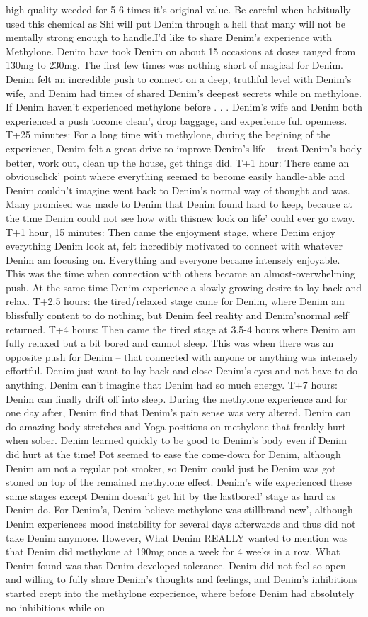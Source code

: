 \documentclass[12pt]{book}
\begin{document}
high quality weeded for 5-6 times it's original value. Be careful when habitually used this chemical as Shi will put Denim through a hell that many will not be mentally strong enough to handle.I'd like to share Denim's experience with Methylone. Denim have took Denim on about 15 occasions at doses ranged from 130mg to 230mg. The first few times was nothing short of magical for Denim. Denim felt an incredible push to connect on a deep, truthful level with Denim's wife, and Denim had times of shared Denim's deepest secrets while on methylone. If Denim haven't experienced methylone before . . .  Denim's wife and Denim both experienced a push tocome clean', drop baggage, and experience full openness. T+25 minutes: For a long time with methylone, during the begining of the experience, Denim felt a great drive to improve Denim's life -- treat Denim's body better, work out, clean up the house, get things did. T+1 hour: There came an obviousclick' point where everything seemed to become easily handle-able and Denim couldn't imagine went back to Denim's normal way of thought and was. Many promised was made to Denim that Denim found hard to keep, because at the time Denim could not see how with thisnew look on life' could ever go away. T+1 hour, 15 minutes: Then came the enjoyment stage, where Denim enjoy everything Denim look at, felt incredibly motivated to connect with whatever Denim am focusing on. Everything and everyone became intensely enjoyable. This was the time when connection with others became an almost-overwhelming push. At the same time Denim experience a slowly-growing desire to lay back and relax. T+2.5 hours: the tired/relaxed stage came for Denim, where Denim am blissfully content to do nothing, but Denim feel reality and Denim'snormal self' returned. T+4 hours: Then came the tired stage at 3.5-4 hours where Denim am fully relaxed but a bit bored and cannot sleep. This was when there was an opposite push for Denim -- that connected with anyone or anything was intensely effortful. Denim just want to lay back and close Denim's eyes and not have to do anything. Denim can't imagine that Denim had so much energy. T+7 hours: Denim can finally drift off into sleep. During the methylone experience and for one day after, Denim find that Denim's pain sense was very altered. Denim can do amazing body stretches and Yoga positions on methylone that frankly hurt when sober. Denim learned quickly to be good to Denim's body even if Denim did hurt at the time! Pot seemed to ease the come-down for Denim, although Denim am not a regular pot smoker, so Denim could just be Denim was got stoned on top of the remained methylone effect. Denim's wife experienced these same stages except Denim doesn't get hit by the lastbored' stage as hard as Denim do. For Denim's, Denim believe methylone was stillbrand new', although Denim experiences mood instability for several days afterwards and thus did not take Denim anymore. However, What Denim REALLY wanted to mention was that Denim did methylone at 190mg once a week for 4 weeks in a row. What Denim found was that Denim developed tolerance. Denim did not feel so open and willing to fully share Denim's thoughts and feelings, and Denim's inhibitions started crept into the methylone experience, where before Denim had absolutely no inhibitions while on 
\end{document}
